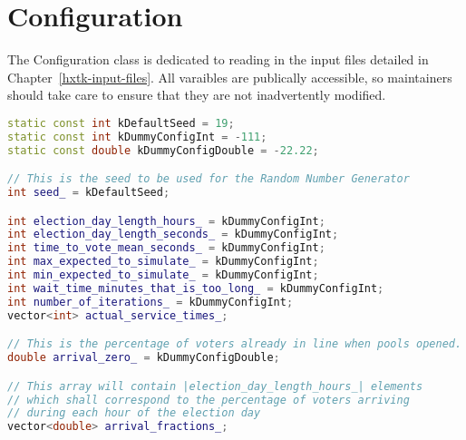 %

\chapter{Configuration}

The Configuration class is dedicated to reading in the input files detailed in Chapter~\ref{hxtk-input-files}. All varaibles are publically accessible, so maintainers should take care to ensure that they are not inadvertently modified.

\begin{lstlisting}[language=C++]
static const int kDefaultSeed = 19;
static const int kDummyConfigInt = -111;
static const double kDummyConfigDouble = -22.22;

// This is the seed to be used for the Random Number Generator
int seed_ = kDefaultSeed;

int election_day_length_hours_ = kDummyConfigInt;
int election_day_length_seconds_ = kDummyConfigInt;
int time_to_vote_mean_seconds_ = kDummyConfigInt;
int max_expected_to_simulate_ = kDummyConfigInt;
int min_expected_to_simulate_ = kDummyConfigInt;
int wait_time_minutes_that_is_too_long_ = kDummyConfigInt;
int number_of_iterations_ = kDummyConfigInt;
vector<int> actual_service_times_;

// This is the percentage of voters already in line when pools opened.
double arrival_zero_ = kDummyConfigDouble;

// This array will contain |election_day_length_hours_| elements
// which shall correspond to the percentage of voters arriving
// during each hour of the election day
vector<double> arrival_fractions_;
\end{lstlisting}